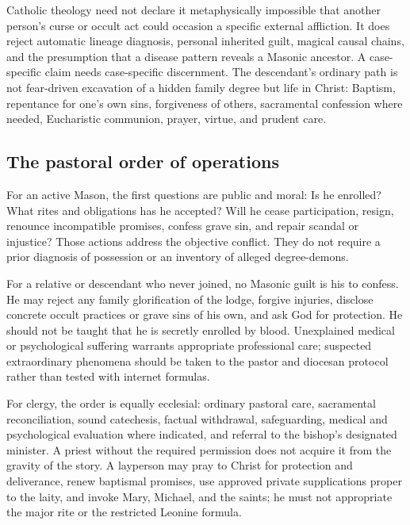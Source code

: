 Catholic theology need not declare it metaphysically impossible that another person's curse or occult act could occasion a specific external affliction.  It does reject automatic lineage diagnosis, personal inherited guilt, magical causal chains, and the presumption that a disease pattern reveals a Masonic ancestor.  A case-specific claim needs case-specific discernment.  The descendant's ordinary path is not fear-driven excavation of a hidden family degree but life in Christ: Baptism, repentance for one's own sins, forgiveness of others, sacramental confession where needed, Eucharistic communion, prayer, virtue, and prudent care.

\subsection{The pastoral order of operations}

For an active Mason, the first questions are public and moral: Is he enrolled?  What rites and obligations has he accepted?  Will he cease participation, resign, renounce incompatible promises, confess grave sin, and repair scandal or injustice?  Those actions address the objective conflict.  They do not require a prior diagnosis of possession or an inventory of alleged degree-demons.

For a relative or descendant who never joined, no Masonic guilt is his to confess.  He may reject any family glorification of the lodge, forgive injuries, disclose concrete occult practices or grave sins of his own, and ask God for protection.  He should not be taught that he is secretly enrolled by blood.  Unexplained medical or psychological suffering warrants appropriate professional care; suspected extraordinary phenomena should be taken to the pastor and diocesan protocol rather than tested with internet formulas.

For clergy, the order is equally ecclesial: ordinary pastoral care, sacramental reconciliation, sound catechesis, factual withdrawal, safeguarding, medical and psychological evaluation where indicated, and referral to the bishop's designated minister.  A priest without the required permission does not acquire it from the gravity of the story.  A layperson may pray to Christ for protection and deliverance, renew baptismal promises, use approved private supplications proper to the laity, and invoke Mary, Michael, and the saints; he must not appropriate the major rite or the restricted Leonine formula.

